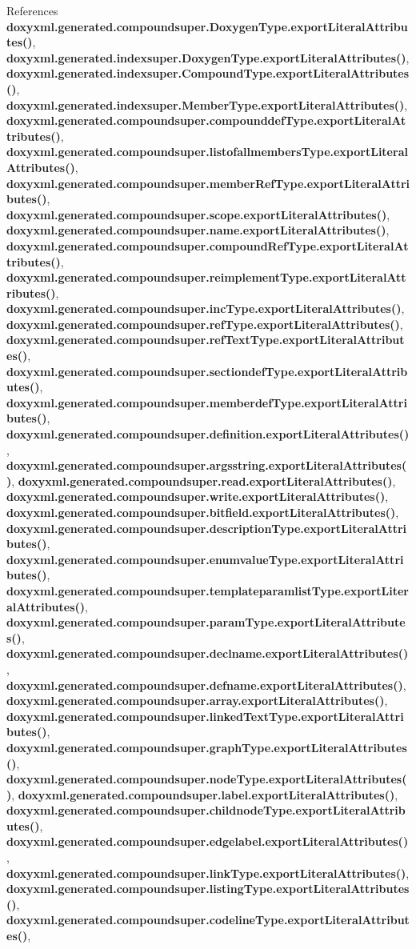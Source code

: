 References {\bf doxyxml.\+generated.\+compoundsuper.\+Doxygen\+Type.\+export\+Literal\+Attributes()}, {\bf doxyxml.\+generated.\+indexsuper.\+Doxygen\+Type.\+export\+Literal\+Attributes()}, {\bf doxyxml.\+generated.\+indexsuper.\+Compound\+Type.\+export\+Literal\+Attributes()}, {\bf doxyxml.\+generated.\+indexsuper.\+Member\+Type.\+export\+Literal\+Attributes()}, {\bf doxyxml.\+generated.\+compoundsuper.\+compounddef\+Type.\+export\+Literal\+Attributes()}, {\bf doxyxml.\+generated.\+compoundsuper.\+listofallmembers\+Type.\+export\+Literal\+Attributes()}, {\bf doxyxml.\+generated.\+compoundsuper.\+member\+Ref\+Type.\+export\+Literal\+Attributes()}, {\bf doxyxml.\+generated.\+compoundsuper.\+scope.\+export\+Literal\+Attributes()}, {\bf doxyxml.\+generated.\+compoundsuper.\+name.\+export\+Literal\+Attributes()}, {\bf doxyxml.\+generated.\+compoundsuper.\+compound\+Ref\+Type.\+export\+Literal\+Attributes()}, {\bf doxyxml.\+generated.\+compoundsuper.\+reimplement\+Type.\+export\+Literal\+Attributes()}, {\bf doxyxml.\+generated.\+compoundsuper.\+inc\+Type.\+export\+Literal\+Attributes()}, {\bf doxyxml.\+generated.\+compoundsuper.\+ref\+Type.\+export\+Literal\+Attributes()}, {\bf doxyxml.\+generated.\+compoundsuper.\+ref\+Text\+Type.\+export\+Literal\+Attributes()}, {\bf doxyxml.\+generated.\+compoundsuper.\+sectiondef\+Type.\+export\+Literal\+Attributes()}, {\bf doxyxml.\+generated.\+compoundsuper.\+memberdef\+Type.\+export\+Literal\+Attributes()}, {\bf doxyxml.\+generated.\+compoundsuper.\+definition.\+export\+Literal\+Attributes()}, {\bf doxyxml.\+generated.\+compoundsuper.\+argsstring.\+export\+Literal\+Attributes()}, {\bf doxyxml.\+generated.\+compoundsuper.\+read.\+export\+Literal\+Attributes()}, {\bf doxyxml.\+generated.\+compoundsuper.\+write.\+export\+Literal\+Attributes()}, {\bf doxyxml.\+generated.\+compoundsuper.\+bitfield.\+export\+Literal\+Attributes()}, {\bf doxyxml.\+generated.\+compoundsuper.\+description\+Type.\+export\+Literal\+Attributes()}, {\bf doxyxml.\+generated.\+compoundsuper.\+enumvalue\+Type.\+export\+Literal\+Attributes()}, {\bf doxyxml.\+generated.\+compoundsuper.\+templateparamlist\+Type.\+export\+Literal\+Attributes()}, {\bf doxyxml.\+generated.\+compoundsuper.\+param\+Type.\+export\+Literal\+Attributes()}, {\bf doxyxml.\+generated.\+compoundsuper.\+declname.\+export\+Literal\+Attributes()}, {\bf doxyxml.\+generated.\+compoundsuper.\+defname.\+export\+Literal\+Attributes()}, {\bf doxyxml.\+generated.\+compoundsuper.\+array.\+export\+Literal\+Attributes()}, {\bf doxyxml.\+generated.\+compoundsuper.\+linked\+Text\+Type.\+export\+Literal\+Attributes()}, {\bf doxyxml.\+generated.\+compoundsuper.\+graph\+Type.\+export\+Literal\+Attributes()}, {\bf doxyxml.\+generated.\+compoundsuper.\+node\+Type.\+export\+Literal\+Attributes()}, {\bf doxyxml.\+generated.\+compoundsuper.\+label.\+export\+Literal\+Attributes()}, {\bf doxyxml.\+generated.\+compoundsuper.\+childnode\+Type.\+export\+Literal\+Attributes()}, {\bf doxyxml.\+generated.\+compoundsuper.\+edgelabel.\+export\+Literal\+Attributes()}, {\bf doxyxml.\+generated.\+compoundsuper.\+link\+Type.\+export\+Literal\+Attributes()}, {\bf doxyxml.\+generated.\+compoundsuper.\+listing\+Type.\+export\+Literal\+Attributes()}, {\bf doxyxml.\+generated.\+compoundsuper.\+codeline\+Type.\+export\+Literal\+Attributes()}, 